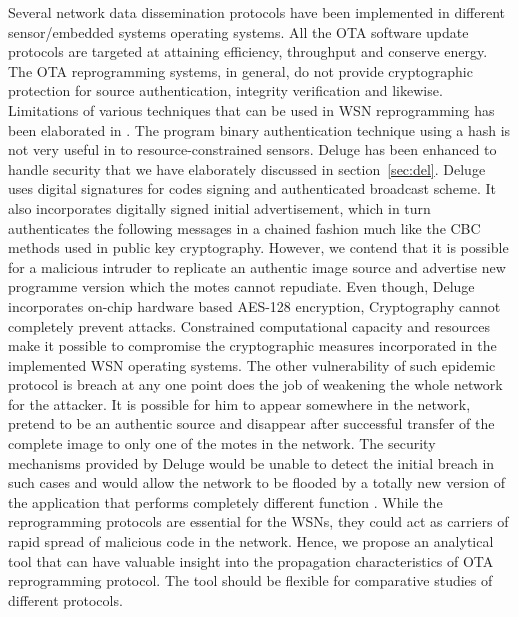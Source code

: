 \documentclass[conference,man]{IEEEtran}
\begin{document}
Several network data dissemination protocols have been implemented in different sensor/embedded systems operating systems.
All the OTA software update protocols are targeted at attaining efficiency, throughput and conserve energy.
The  OTA reprogramming systems, in general, do not provide cryptographic protection for source authentication, integrity verification and likewise. 
Limitations of various techniques that can be used in WSN reprogramming has been elaborated in \cite{1127826}. 
The program binary authentication technique using a hash is not very useful in to resource-constrained sensors. 
Deluge has been enhanced to handle security that we have elaborately discussed in section~\ref{sec:del}. 
Deluge uses digital signatures for codes signing and authenticated broadcast scheme. 
It also incorporates digitally signed initial advertisement, which in turn authenticates the following messages in a chained fashion much like the CBC methods used in public key cryptography.
However, we contend that it is possible for a malicious intruder to replicate an authentic image source and advertise new programme version which the motes cannot repudiate. 
Even though,  Deluge incorporates on-chip hardware based AES-128 encryption,
Cryptography cannot completely prevent attacks.%
Constrained computational capacity and resources make it possible to compromise the cryptographic measures incorporated in the implemented WSN operating systems.
The other vulnerability of such epidemic protocol is breach at any one point does the job of weakening the whole network for the attacker. 
It is possible for him to appear somewhere in the network, pretend to be an authentic source and disappear after successful transfer of the complete image to only one of the motes in the network. 
The security mechanisms provided by Deluge would be unable to detect the initial breach in such cases and would allow the network to be flooded by a totally new version of the application that performs completely different function \cite{Karlof:2004:TLL:1031495.1031515}.
While the reprogramming protocols are essential for the WSNs, they could act as carriers of rapid spread of malicious code in the network.
Hence, we propose an analytical tool that can have valuable insight into the propagation characteristics of OTA reprogramming protocol. 
The tool should be flexible for comparative studies of different protocols. 
\end{document}
